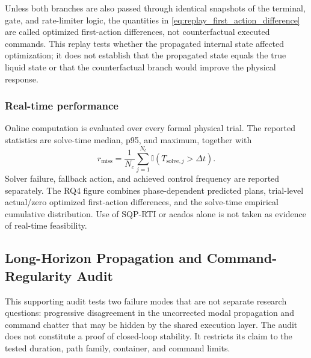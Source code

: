Unless both branches are also passed through identical snapshots of the
terminal, gate, and rate-limiter logic, the quantities in
\cref{eq:replay_first_action_difference} are called optimized first-action
differences, not counterfactual executed commands. This replay tests whether
the propagated internal state affected optimization; it does not establish
that the propagated state equals the true liquid state or that the
counterfactual branch would improve the physical response.

\subsubsection{Real-time performance}

Online computation is evaluated over every formal physical trial. The reported
statistics are solve-time median, p95, and maximum, together with
\begin{equation}
  r_{\mathrm{miss}}
  =\frac{1}{N_c}\sum_{j=1}^{N_c}
  \mathbb I(T_{\mathrm{solve},j}>\Delta t).
  \label{eq:deadline_miss_ratio}
\end{equation}
Solver failure, fallback action, and achieved control frequency are reported
separately. The RQ4 figure combines phase-dependent predicted plans,
trial-level actual/zero optimized first-action differences, and the solve-time
empirical cumulative distribution. Use of SQP-RTI or acados alone is not taken
as evidence of real-time feasibility.


\subsection{Long-Horizon Propagation and Command-Regularity Audit}
\label{sec:long_horizon_command_audit}

This supporting audit tests two failure modes that are not separate research
questions: progressive disagreement in the uncorrected modal propagation and
command chatter that may be hidden by the shared execution layer. The audit
does not constitute a proof of closed-loop stability. It restricts its claim to
the tested duration, path family, container, and command limits.

